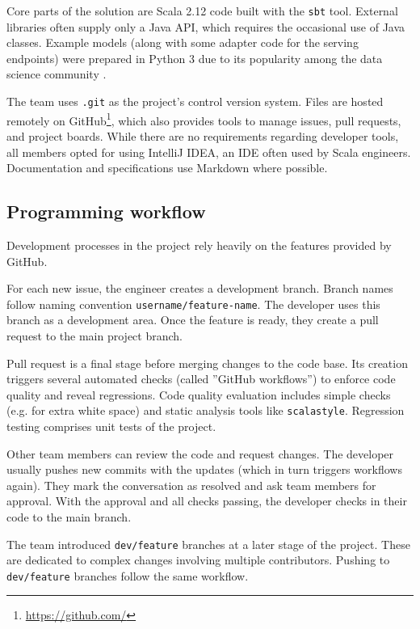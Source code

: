 Core parts of the solution are Scala 2.12 code built with the \texttt{sbt} tool.
External libraries often supply only a Java API, which requires the occasional use of Java classes.
Example models (along with some adapter code for the serving endpoints) were prepared in Python 3 due to its popularity among the data science community \cite{srinath2017python}.

The team uses \texttt{.git} as the project's control version system.
Files are hosted remotely on GitHub\footnote{\href{https://github.com/}{https://github.com/}}, which also provides tools to manage issues, pull requests, and project boards.
While there are no requirements regarding developer tools, all members opted for using IntelliJ IDEA, an IDE often used by Scala engineers.
Documentation and specifications use Markdown where possible.

\subsection{Programming workflow}

Development processes in the project rely heavily on the features provided by GitHub.

For each new issue, the engineer creates a development branch. Branch names follow naming convention \texttt{username/feature-name}.
The developer uses this branch as a development area.
Once the feature is ready, they create a pull request to the main project branch.

Pull request is a final stage before merging changes to the code base.
Its creation triggers several automated checks (called ''GitHub workflows'') to enforce code quality and reveal regressions.
Code quality evaluation includes simple checks (e.g. for extra white space) and static analysis tools like \texttt{scalastyle}.
Regression testing comprises unit tests of the project.

Other team members can review the code and request changes.
The developer usually pushes new commits with the updates (which in turn triggers workflows again).
They mark the conversation as resolved and ask team members for approval.
With the approval and all checks passing, the developer checks in their code to the main branch.

The team introduced \texttt{dev/feature} branches at a later stage of the project.
These are dedicated to complex changes involving multiple contributors.
Pushing to \texttt{dev/feature} branches follow the same workflow.

